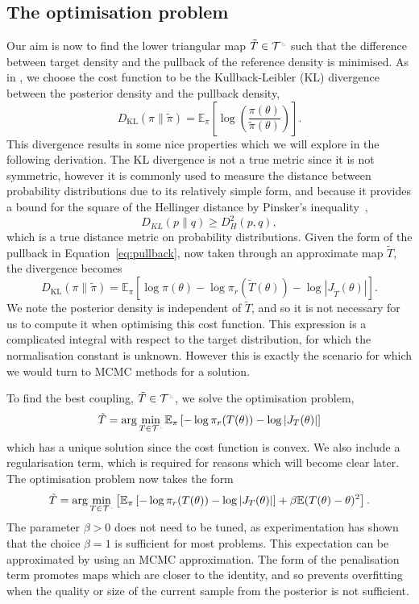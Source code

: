 \documentclass[final]{siamltex}
\newcommand{\ltri}{%
\,\resizebox{!}{0.25\baselineskip}{%
\begin{tikzpicture}%
\draw[line width=1mm](0,0) -- (0,2) -- (2,0)  -- (0,0);
\end{tikzpicture}%
}\xspace%
}%
\newcommand{\smallltri}{%
\,\resizebox{!}{0.15\baselineskip}{%
\begin{tikzpicture}%
\draw[line width=1mm](0,0) -- (0,2) -- (2,0)  -- (0,0);
\end{tikzpicture}%
}\xspace%
}%
\begin{document}
\subsection{The optimisation problem}
Our aim is now to find the lower triangular map $\tilde{T} \in
\mathcal{T}^{\ltri}$ such that the difference between target
density and the pullback of the reference density is minimised. As in
\cite{parno2014transport}, we choose the cost function
to be the Kullback-Leibler (KL) divergence between the posterior density and the pullback density,
\[
	D_\text{KL}(\pi\|\tilde{\pi}) =
		\mathbb{E}_\pi\left[\log\left(\frac{\pi(\theta)}{\tilde{\pi}(\theta)}\right)\right].
\]
This divergence results in some nice properties which we will explore in the following derivation. The KL divergence is not a true metric since it is not symmetric, however it is commonly used to measure the distance between probability distributions due to its relatively simple form, and because it provides a bound for the square of the Hellinger distance by Pinsker's inequality~\cite{pinsker1960information},
\[
	D_{KL}(p\|q) \geq D_H^2(p,q),
\]
which is a true distance metric on probability distributions.
Given the form of the pullback in Equation~\eqref{eq:pullback}, now taken through an approximate map $\tilde{T}$, the divergence becomes
\[
	D_\text{KL}(\pi\|\tilde{\pi}) = \mathbb{E}_\pi\left[\log\pi(\theta) - \log\pi_r(\tilde{T}(\theta)) -
		\log\left|J_{\tilde{T}}(\theta)\right|\right].
\]
We note the posterior density is independent of $\tilde{T}$, and so it is not necessary for us to compute it when optimising this cost function. This expression is a complicated integral with respect to the target distribution, for which the normalisation constant is unknown. However this is exactly the scenario for which we would turn to MCMC methods for a solution.

To find the best coupling, $\tilde{T} \in \mathcal{T}^{\ltri}$, we solve the optimisation problem,
\[
	\tilde{T} = \arg\min_{T \in \mathcal{T}^{\smallltri}} \mathbb{E}_\pi\left[-\log\pi_r(T(\theta)) -
		\log\left|J_T(\theta)\right|\right]
\]
which has a unique solution since the cost function is convex. We also include a regularisation term, which is required for reasons which will become clear later. The optimisation problem now takes the form
\begin{equation}\label{eq:gen_map_optim}
	\tilde{T} = \arg\min_{T\in\mathcal{T}^{\smallltri}} \left[
		 \mathbb{E}_\pi\left[-\log\pi_r(T(\theta)) -
		\log\left|J_T(\theta)\right|\right] + \beta\mathbb{E}(T(\theta)- \theta)^2 \right].
\end{equation}
The parameter $\beta>0$ does not need to be tuned, as experimentation has shown that the choice
$\beta=1$ is sufficient for most problems. This expectation can be
approximated by using an MCMC approximation. The form of the penalisation term promotes maps which are
closer to the identity, and so prevents overfitting when the quality
or size of the current sample from the posterior is not sufficient.
\end{document}
